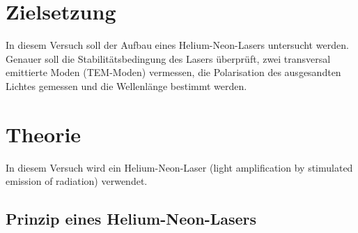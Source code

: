 \section{Zielsetzung}
In diesem Versuch soll der
Aufbau eines Helium-Neon-Lasers untersucht werden.
Genauer soll die Stabilitätsbedingung des Lasers überprüft, zwei 
transversal emittierte Moden (TEM-Moden) vermessen, die Polarisation des 
ausgesandten Lichtes gemessen und die Wellenlänge bestimmt werden.

\section{Theorie}
\label{sec:Theorie}

In diesem Versuch wird ein Helium-Neon-Laser (light amplification by stimulated emission 
of radiation) verwendet.

\subsection{Prinzip eines Helium-Neon-Lasers}


